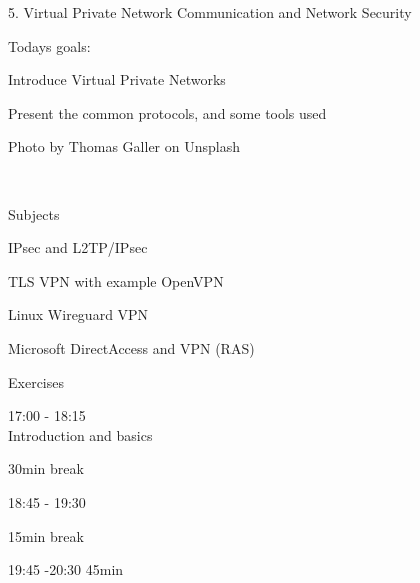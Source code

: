 \documentclass[Screen16to9,17pt]{foils}
\begin{document}
\mytitlepage
{5. Virtual Private Network}
{Communication and Network Security \the\year}




Todays goals:
\begin{list2}
\item Introduce Virtual Private Networks
\item Present the common protocols, and some tools used
\end{list2}

Photo by Thomas Galler on Unsplash




{~}

\begin{list1}
\item Subjects
\begin{list2}
\item IPsec and L2TP/IPsec
\item TLS VPN with example OpenVPN
\item Linux Wireguard VPN
\item Microsoft DirectAccess and VPN (RAS)
\end{list2}
\item Exercises
\begin{list2}
\item
\end{list2}
\end{list1}




\begin{list2}
\item 17:00 - 18:15\\
Introduction and basics
\item 30min break\\

\item 18:45 - 19:30\\

\item 15min break\\

\item 19:45 -20:30 45min\\
\end{list2}
\end{document}
